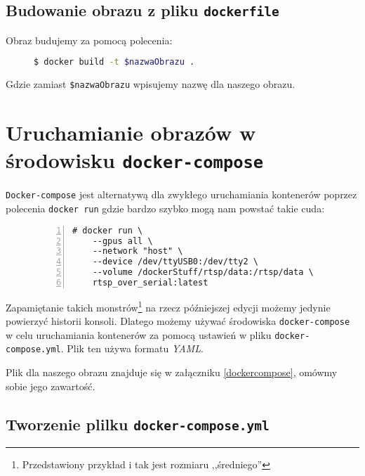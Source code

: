 \documentclass[a4paper,12pt]{article}
\begin{document}
\subsection*{Budowanie obrazu z pliku \texttt{dockerfile}}

Obraz budujemy za pomocą polecenia:

\begin{figure}[H]
    \begin{lstlisting}[frame=single,basicstyle=\footnotesize\ttfamily,language=bash,morekeywords={docker}]
$ docker build -t $nazwaObrazu .
    \end{lstlisting}
\end{figure}

Gdzie zamiast \texttt{\$nazwaObrazu} wpisujemy nazwę dla naszego obrazu.

\section{Uruchamianie obrazów w środowisku \texttt{docker-compose}}

\texttt{Docker-compose} jest alternatywą dla zwykłego uruchamiania kontenerów poprzez polecenia \texttt{docker run} gdzie bardzo szybko mogą nam powstać takie cuda:

\begin{figure}[H]
    \begin{lstlisting}[frame=single,basicstyle=\footnotesize\ttfamily,morekeywords={docker,\\},numbers=left]
# docker run \
    --gpus all \
    --network "host" \
    --device /dev/ttyUSB0:/dev/tty2 \
    --volume /dockerStuff/rtsp/data:/rtsp/data \
    rtsp_over_serial:latest
    \end{lstlisting}
\end{figure}

Zapamiętanie takich monstrów\footnote{Przedstawiony przykład i tak jest rozmiaru ,,średniego''} na rzecz późniejszej edycji możemy jedynie powierzyć historii konsoli. Dlatego możemy używać środowiska \texttt{docker-compose} w celu uruchamiania kontenerów za pomocą ustawień w pliku \texttt{docker-compose.yml}. Plik ten używa formatu \emph{YAML}.

Plik dla naszego obrazu znajduje się w załączniku \ref{dockercompose}, omówmy sobie jego zawartość.

\subsection*{Tworzenie plilku \texttt{docker-compose.yml}}
\end{document}
